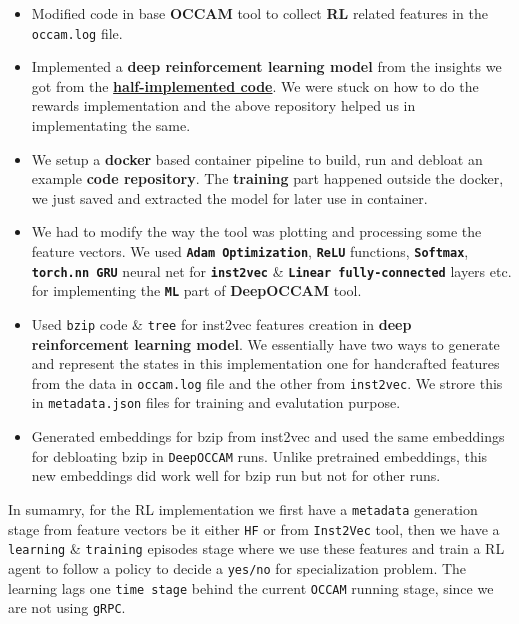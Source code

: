 \documentclass{relatorio}
\begin{document}
\begin{itemize}
	\item Modified code in base \textbf{OCCAM} tool to collect \textbf{RL} related features in the \texttt{occam.log} file. 
	\item Implemented a \textbf{deep reinforcement learning model} from the insights we got from the \textbf{\href{https://github.com/nhamlv-55/OCCAM/tree/mlpolicy}{half-implemented code}}. We were stuck on how to do the rewards implementation and the above repository helped us in implementating the same. 
	\item We setup a \textbf{docker} based container pipeline to build, run and debloat an example \textbf{\color{blue} code repository}. The \textbf{training} part happened outside the docker, we just saved and extracted the model for later use in container. 
	\item We had to modify the way the tool was plotting and processing some the feature vectors. We used \textbf{\texttt{Adam Optimization}}, \textbf{\texttt{ReLU}} functions, \textbf{\texttt{Softmax}}, \textbf{\texttt{torch.nn GRU}} neural net for \textbf{\texttt{inst2vec}} \& \textbf{\texttt{Linear fully-connected}} layers etc. for implementing the \textbf{\texttt{ML}} part of \textbf{DeepOCCAM} tool.
	\item Used \texttt{bzip} code \& \texttt{tree} for inst2vec features creation in \textbf{deep reinforcement learning model}. We essentially have two ways to generate and represent the states in this implementation one for handcrafted features from the data in \texttt{occam.log} file and the other from \texttt{inst2vec}. We strore this in \texttt{metadata.json} files for training and evalutation purpose. 
	\item Generated embeddings for bzip from inst2vec and used the same embeddings for debloating bzip in \texttt{DeepOCCAM} runs. Unlike pretrained embeddings, this new embeddings did work well for bzip run but not for other runs.   
\end{itemize}

In sumamry, for the RL implementation we first have a \texttt{metadata} generation stage from feature vectors be it either \texttt{HF} or from \texttt{Inst2Vec} tool, then we have a \texttt{learning} \& \texttt{training} episodes stage where we use these features and train a RL agent to follow a policy to decide a \texttt{yes/no} for specialization problem. The learning lags one \texttt{time stage} behind the current \texttt{OCCAM} running stage, since we are not using \texttt{gRPC}.   
\end{document}
